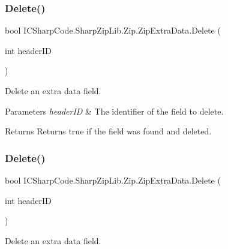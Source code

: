\subsubsection{\texorpdfstring{Delete()}{Delete()}\hspace{0.1cm}{\footnotesize\ttfamily [1/2]}}
{\footnotesize\ttfamily bool I\+C\+Sharp\+Code.\+Sharp\+Zip\+Lib.\+Zip.\+Zip\+Extra\+Data.\+Delete (\begin{DoxyParamCaption}\item[{int}]{header\+ID }\end{DoxyParamCaption})\hspace{0.3cm}{\ttfamily [inline]}}



Delete an extra data field. 


\begin{DoxyParams}{Parameters}
{\em header\+ID} & The identifier of the field to delete.\\
\hline
\end{DoxyParams}
\begin{DoxyReturn}{Returns}
Returns true if the field was found and deleted.
\end{DoxyReturn}
\mbox{\label{class_i_c_sharp_code_1_1_sharp_zip_lib_1_1_zip_1_1_zip_extra_data_a6726b4cecc913a3a09cea0b97e2edf7b}} 
\subsubsection{\texorpdfstring{Delete()}{Delete()}\hspace{0.1cm}{\footnotesize\ttfamily [2/2]}}
{\footnotesize\ttfamily bool I\+C\+Sharp\+Code.\+Sharp\+Zip\+Lib.\+Zip.\+Zip\+Extra\+Data.\+Delete (\begin{DoxyParamCaption}\item[{int}]{header\+ID }\end{DoxyParamCaption})\hspace{0.3cm}{\ttfamily [inline]}}



Delete an extra data field. 



